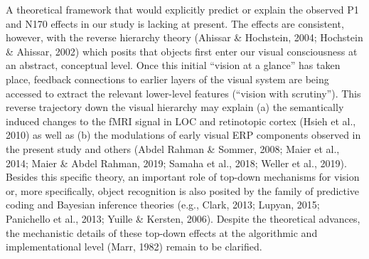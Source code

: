 \documentclass[
  english,
  doc,12pt,twoside,floatsintext]{apa7}
\begin{document}
A theoretical framework that would explicitly predict or explain the observed P1 and N170 effects in our study is lacking at present. The effects are consistent, however, with the reverse hierarchy theory (Ahissar \& Hochstein, 2004; Hochstein \& Ahissar, 2002) which posits that objects first enter our visual consciousness at an abstract, conceptual level. Once this initial ``vision at a glance'' has taken place, feedback connections to earlier layers of the visual system are being accessed to extract the relevant lower-level features (``vision with scrutiny''). This reverse trajectory down the visual hierarchy may explain (a) the semantically induced changes to the fMRI signal in LOC and retinotopic cortex (Hsieh et al., 2010) as well as (b) the modulations of early visual ERP components observed in the present study and others (Abdel Rahman \& Sommer, 2008; Maier et al., 2014; Maier \& Abdel Rahman, 2019; Samaha et al., 2018; Weller et al., 2019). Besides this specific theory, an important role of top-down mechanisms for vision or, more specifically, object recognition is also posited by the family of predictive coding and Bayesian inference theories (e.g., Clark, 2013; Lupyan, 2015; Panichello et al., 2013; Yuille \& Kersten, 2006). Despite the theoretical advances, the mechanistic details of these top-down effects at the algorithmic and implementational level (Marr, 1982) remain to be clarified.
\end{document}
